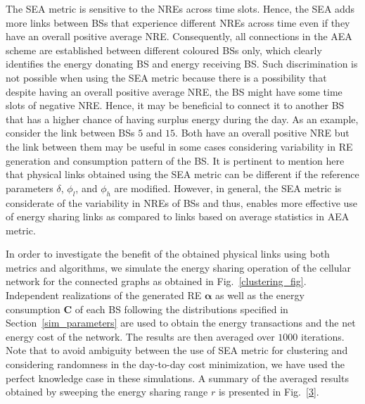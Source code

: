 \documentclass[10pt, letter,twocolumn]{IEEEtran}
\begin{document}
The SEA metric is sensitive to the NREs across time slots. Hence, the SEA adds more links between BSs that experience different NREs across time even if they have an overall positive average NRE. Consequently, all connections in the AEA scheme are established between different coloured BSs only, which clearly identifies the energy donating BS and energy receiving BS. Such discrimination is not possible when using the SEA metric because there is a possibility that despite having an overall positive average NRE, the BS might have some time slots of negative NRE. Hence, it may be beneficial to connect it to another BS that has a higher chance of having surplus energy during the day. As an example, consider the link between BSs $5$ and $15$. Both have an overall positive NRE but the link between them may be useful in some cases considering variability in RE generation and consumption pattern of the BS. It is pertinent to mention here that physical links obtained using the SEA metric can be different if the reference parameters $\delta$, $\phi_{l}$, and $\phi_{h}$ are modified. However, in general, the SEA metric is considerate of the variability in NREs of BSs and thus, enables more effective use of energy sharing links as compared to links based on average statistics in AEA metric.

In order to investigate the benefit of the obtained physical links using both metrics and algorithms, we simulate the energy sharing operation of the cellular network for the connected graphs as obtained in Fig.~\ref{clustering_fig}. Independent realizations of the generated RE $\boldsymbol{\alpha}$ as well as the energy consumption $\mathbf{C}$ of each BS following the distributions specified in Section~\ref{sim_parameters} are used to obtain the energy transactions and the net energy cost of the network. The results are then averaged over $1000$ iterations. Note that to avoid ambiguity between the use of SEA metric for clustering and considering randomness in the day-to-day cost minimization, we have used the perfect knowledge case in these simulations. A summary of the averaged results obtained by sweeping the energy sharing range $r$ is presented in Fig.~\ref{3}.
\end{document}
